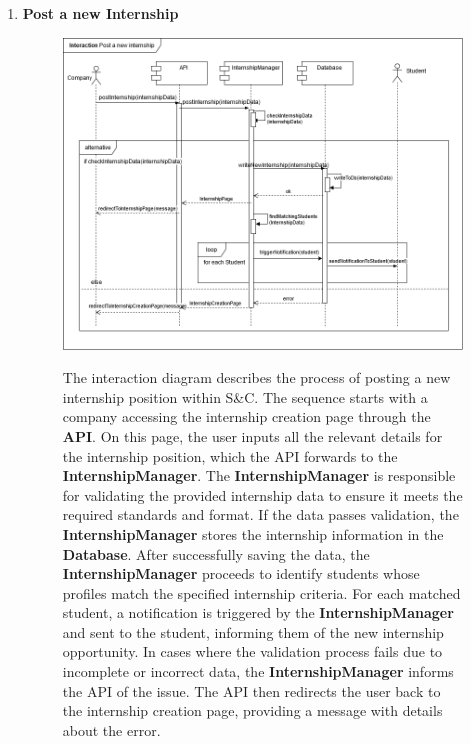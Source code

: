\begin{enumerate}
    \newpage
    \item \textbf{Post a new Internship}
    \begin{figure}[h!]
            \centering  \includegraphics[width=1\textwidth]{DD/Images/Interactions/INT09_PostNewInternship.drawio.png}
            \label{fig:ComponentViewDiagram}
            \caption*{The interaction diagram describes the process of posting a new internship position within S\&C. The sequence starts with a company accessing the internship creation page through the \textbf{API}. On this page, the user inputs all the relevant details for the internship position, which the API forwards to the \textbf{InternshipManager}. The \textbf{InternshipManager} is responsible for validating the provided internship data to ensure it meets the required standards and format. If the data passes validation, the \textbf{InternshipManager} stores the internship information in the \textbf{Database}. After successfully saving the data, the \textbf{InternshipManager} proceeds to identify students whose profiles match the specified internship criteria. For each matched student, a notification is triggered by the \textbf{InternshipManager} and sent to the student, informing them of the new internship opportunity. In cases where the validation process fails due to incomplete or incorrect data, the \textbf{InternshipManager} informs the API of the issue. The API then redirects the user back to the internship creation page, providing a message with details about the error.
            }       
    \end{figure}


\end{enumerate}
